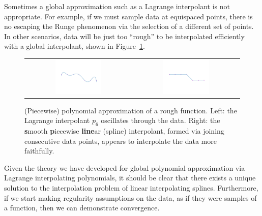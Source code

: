 Sometimes a global approximation such as a Lagrange interpolant is not appropriate. For example, if we must sample data at equispaced points, there is no escaping the Runge phenomenon via the selection of a different set of points. In other scenarios, data will be just too ``rough'' to be interpolated efficiently with a global interpolant, shown in Figure~\ref{figure:SplineIntro}.

\begin{figure}[htbp]
\begin{center}
\begin{tabular}{cc}
\hspace*{-0.5cm}\includegraphics[width=0.45\textwidth]{spline1a}&
\hspace*{-0.5cm}\includegraphics[width=0.45\textwidth]{spline1b}\\
\end{tabular}
\vspace*{-1cm}
\caption{(Piecewise) polynomial approximation of a rough function. Left: the Lagrange interpolant $p_6$ oscillates through the data. Right: the {\bf s}mooth {\bf p}iecewise {\bf line}ar (spline) interpolant, formed via joining consecutive data points, appears to interpolate the data more faithfully.}
\label{figure:SplineIntro}
\end{center}
\end{figure}

Given the theory we have developed for global polynomial approximation via Lagrange interpolating polynomials, it should be clear that there exists a unique solution to the interpolation problem of linear interpolating splines. Furthermore, if we start making regularity assumptions on the data, as if they were samples of a function, then we can demonstrate convergence.

